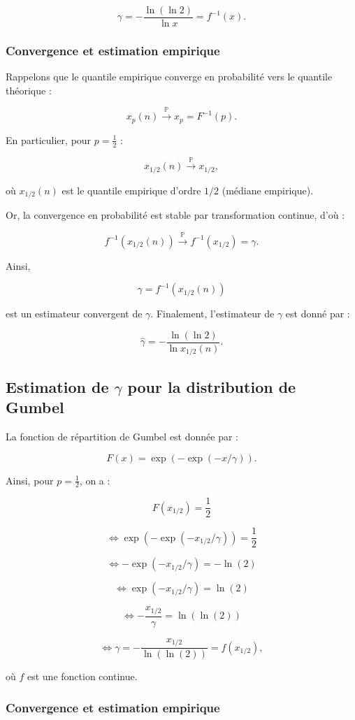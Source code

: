 \documentclass{article}
\begin{document}
\[
\gamma = -\frac{\ln (\ln 2)}{\ln x} = f^{-1}(x).
\]

\subsubsection{Convergence et estimation empirique}

Rappelons que le quantile empirique converge en probabilité vers le quantile théorique :

\[
x_p(n) \xrightarrow{\mathbb{P}} x_p = F^{-1}(p).
\]

En particulier, pour \(p = \frac{1}{2}\) :

\[
x_{1/2}(n) \xrightarrow{\mathbb{P}} x_{1/2},
\]

où \(x_{1/2}(n)\) est le quantile empirique d'ordre \(1/2\) (médiane empirique).  

Or, la convergence en probabilité est stable par transformation continue, d'où :

\[
f^{-1}(x_{1/2}(n)) \xrightarrow{\mathbb{P}} f^{-1}(x_{1/2}) = \gamma.
\]

Ainsi, 

\[
\gamma = f^{-1}(x_{1/2}(n))
\]

est un estimateur convergent de \(\gamma\).  
Finalement, l'estimateur de \(\gamma\) est donné par :

\[
\hat{\gamma} = -\frac{\ln (\ln 2)}{\ln x_{1/2}(n)}.
\]
\subsection{Estimation de \(\gamma\) pour la distribution de Gumbel}

La fonction de répartition de Gumbel est donnée par :

\[
F(x) = \exp(-\exp(-x/\gamma)).
\]

Ainsi, pour \(p = \frac{1}{2}\), on a :

\[
F(x_{1/2}) = \frac{1}{2}
\]

\[
\iff \exp(-\exp(-x_{1/2}/\gamma)) = \frac{1}{2}
\]

\[
\iff -\exp(-x_{1/2}/\gamma) = -\ln(2)
\]

\[
\iff \exp(-x_{1/2}/\gamma) = \ln(2)
\]

\[
\iff -\frac{x_{1/2}}{\gamma} = \ln(\ln(2))
\]

\[
\iff \gamma = -\frac{x_{1/2}}{\ln(\ln(2))} = f(x_{1/2}),
\]

où \(f\) est une fonction continue.

\subsubsection{Convergence et estimation empirique}
\end{document}
